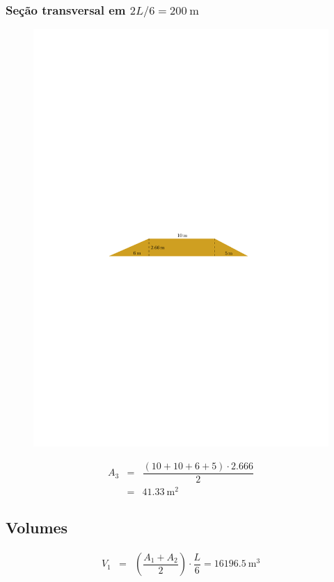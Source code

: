 \documentclass[a4paper, 12pt, brazilian]{article}
\begin{document}
	\subsubsection{Seção transversal em $2L/6=\SI{200}{\meter}$}
	
	\begin{figure}[H]
		\centering
		\includegraphics[width=0.85\linewidth]{images/twolpersix}
		\label{fig:twolpersix}
	\end{figure}
	
	\begin{eqnarray}
		A_{3}&=&\dfrac{(10+10+6+5)\cdot 2.666}{2}\\
		&=&\SI{41.33}{\meter^{2}}
	\end{eqnarray}
	
	\subsection{Volumes}
	
	\begin{eqnarray}
		V_{1}&=&\left(\dfrac{A_{1}+A_{2}}{2}\right)\cdot\dfrac{L}{6}=\SI{16196.5}{\meter^{3}}
	\end{eqnarray}
	
\end{document}
